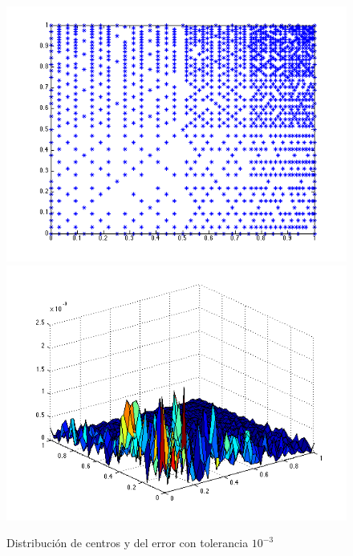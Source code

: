 \documentclass[11pt,a4paper]{article}
\begin{document}
\begin{figure}[H]
\begin{center}
\includegraphics[scale=.4]{edp3_tol3.png}
\includegraphics[scale=.4]{error_edp3_tol3.png}
\caption{Distribución de centros y del error con tolerancia $10^{-3}$}
\end{center}
\end{figure}
\end{document}
